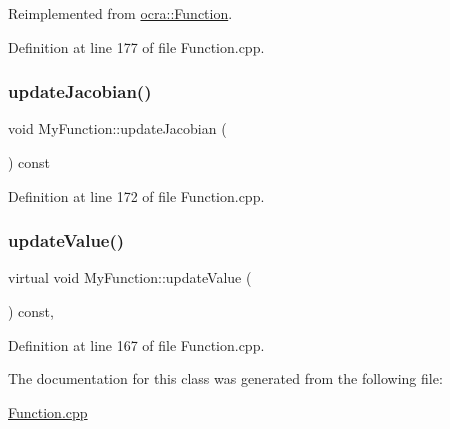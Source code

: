 Reimplemented from \hyperlink{classocra_1_1Function_a2f09ce859333f22fdd527ff08aee6e6e}{ocra\+::\+Function}.



Definition at line 177 of file Function.\+cpp.

\hypertarget{classMyFunction_a5ff3f1717385a96fe60fb1b993db0ef3}{}\label{classMyFunction_a5ff3f1717385a96fe60fb1b993db0ef3} 
\subsubsection{\texorpdfstring{update\+Jacobian()}{updateJacobian()}}
{\footnotesize\ttfamily void My\+Function\+::update\+Jacobian (\begin{DoxyParamCaption}{ }\end{DoxyParamCaption}) const\hspace{0.3cm}{\ttfamily [inline]}}



Definition at line 172 of file Function.\+cpp.

\hypertarget{classMyFunction_a53829722ebc3fce3d1fa9b96c61b2b53}{}\label{classMyFunction_a53829722ebc3fce3d1fa9b96c61b2b53} 
\subsubsection{\texorpdfstring{update\+Value()}{updateValue()}}
{\footnotesize\ttfamily virtual void My\+Function\+::update\+Value (\begin{DoxyParamCaption}{ }\end{DoxyParamCaption}) const\hspace{0.3cm}{\ttfamily [inline]}, {\ttfamily [virtual]}}



Definition at line 167 of file Function.\+cpp.



The documentation for this class was generated from the following file\+:\begin{DoxyCompactItemize}
\item 
\hyperlink{Function_8cpp}{Function.\+cpp}\end{DoxyCompactItemize}
